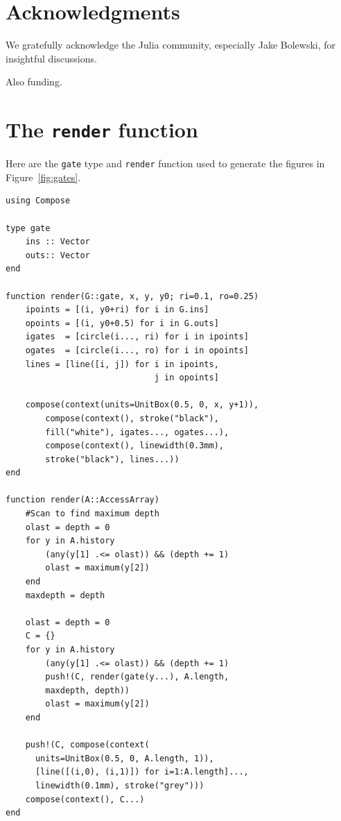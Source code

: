 \documentclass{sig-alternate}
\newcommand{\code}[1]{\texttt{#1}}
\begin{document}
\section{Acknowledgments}
We gratefully acknowledge the Julia community, especially Jake Bolewski, for insightful discussions.

Also funding.




\appendix

\section{The \code{render} function}
\label{sec:render}

Here are the \code{gate} type and \code{render} function used to generate the figures in Figure~\ref{fig:gates}.

\begin{verbatim}
using Compose

type gate
    ins :: Vector
    outs:: Vector
end

function render(G::gate, x, y, y0; ri=0.1, ro=0.25)
    ipoints = [(i, y0+ri) for i in G.ins]
    opoints = [(i, y0+0.5) for i in G.outs]
    igates  = [circle(i..., ri) for i in ipoints]
    ogates  = [circle(i..., ro) for i in opoints]
    lines = [line([i, j]) for i in ipoints,
                              j in opoints]

    compose(context(units=UnitBox(0.5, 0, x, y+1)),
        compose(context(), stroke("black"),
	    fill("white"), igates..., ogates...),
        compose(context(), linewidth(0.3mm),
	    stroke("black"), lines...))
end

function render(A::AccessArray)
    #Scan to find maximum depth
    olast = depth = 0
    for y in A.history
        (any(y[1] .<= olast)) && (depth += 1)
        olast = maximum(y[2])
    end
    maxdepth = depth
    
    olast = depth = 0
    C = {}
    for y in A.history
        (any(y[1] .<= olast)) && (depth += 1)
        push!(C, render(gate(y...), A.length,
	    maxdepth, depth))
        olast = maximum(y[2])
    end
    
    push!(C, compose(context(
      units=UnitBox(0.5, 0, A.length, 1)),
      [line([(i,0), (i,1)]) for i=1:A.length]...,
      linewidth(0.1mm), stroke("grey")))
    compose(context(), C...)
end
\end{verbatim}
\end{document}
